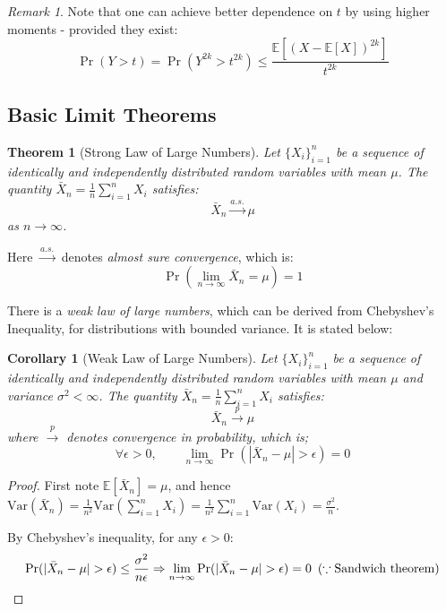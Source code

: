 \documentclass{article}
\newtheorem{theorem}{Theorem}[subsection]
\newtheorem{corollary}{Corollary}[subsection]
\theoremstyle{remark}
\newtheorem*{remark}{Remark}
\newcommand{\Exp}{\mathbb{E}}
\newcommand{\Var}{\mathrm{Var}}
\begin{document}
\begin{remark}
Note that one can achieve better dependence on \(t\) by using higher moments - provided they exist:
\begin{equation*}
\Pr(Y > t) = \Pr(Y^{2k} > t^{2k}) \leq \frac{\Exp[(X - \Exp[X])^{2k}]}{t^{2k}}
\end{equation*}
\end{remark}

\subsection{Basic Limit Theorems}
\begin{theorem}[Strong Law of Large Numbers]
Let \(\{X_{i}\}_{i=1}^{n}\) be a sequence of identically and independently distributed random variables with mean \(\mu\). The quantity \(\bar{X}_{n} = \frac{1}{n}\sum\limits_{i=1}^{n} X_{i}\) satisfies:
\begin{equation*}
\bar{X}_{n} \xrightarrow{a.s.} \mu
\end{equation*}
as \(n \to \infty\).
\end{theorem}

Here \(\xrightarrow{a.s.}\) denotes \emph{almost sure convergence}, which is:
\begin{equation*}
\Pr\left(\lim_{n \to \infty} \bar{X}_{n} = \mu\right) = 1
\end{equation*}

There is a \emph{weak law of large numbers}, which can be derived from Chebyshev's Inequality, for distributions with bounded variance. It is stated below:
\begin{corollary}[Weak Law of Large Numbers]
Let \(\{X_{i}\}_{i=1}^{n}\) be a sequence of identically and independently distributed random variables with mean \(\mu\) and variance \(\sigma^{2} < \infty\). The quantity \(\bar{X}_{n} = \frac{1}{n}\sum\limits_{i=1}^{n} X_{i}\) satisfies:
\begin{equation*}
\bar{X}_{n} \xrightarrow{p} \mu
\end{equation*}
where \(\xrightarrow{p}\) denotes \emph{convergence in probability}, which is;
\begin{equation*}
\forall \epsilon > 0, \qquad \lim_{n \to \infty} \Pr\left(|\bar{X}_{n} - \mu| > \epsilon\right) = 0
\end{equation*}
\end{corollary}

\begin{proof}
First note \(\Exp\left[\bar{X}_{n}\right] = \mu\), and hence \(\Var(\bar{X}_{n}) = \frac{1}{n^{2}}\Var\left(\sum\limits_{i=1}^{n}X_{i}\right) = \frac{1}{n^{2}}\sum\limits_{i=1}^{n}\Var\left(X_{i}\right) = \frac{\sigma^{2}}{n}\).

By Chebyshev's inequality, for any \(\epsilon > 0\):
\begin{equation*}
\Pr(|\bar{X}_{n} - \mu| > \epsilon) \leq \frac{\sigma^{2}}{n\epsilon} \Rightarrow \lim_{n \to \infty} \Pr(|\bar{X}_{n} - \mu| > \epsilon) = 0 \enskip (\because \text{Sandwich theorem})
\end{equation*}
\end{proof}
\end{document}
